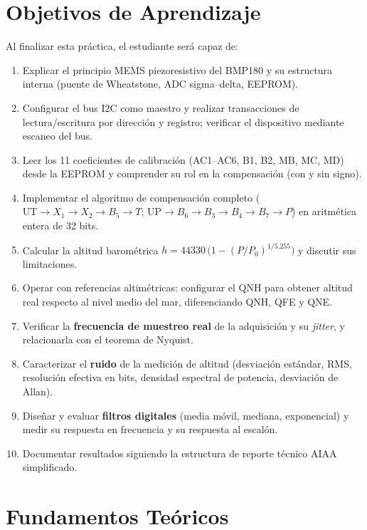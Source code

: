 \documentclass[11pt]{article}
\begin{document}
\section{Objetivos de Aprendizaje}

Al finalizar esta práctica, el estudiante será capaz de:
\begin{enumerate}
  \item Explicar el principio MEMS piezoresistivo del BMP180 y su estructura interna
        (puente de Wheatstone, ADC sigma--delta, EEPROM).
  \item Configurar el bus I2C como maestro y realizar transacciones de lectura/escritura
        por dirección y registro; verificar el dispositivo mediante escaneo del bus.
  \item Leer los 11 coeficientes de calibración (AC1--AC6, B1, B2, MB, MC, MD) desde la
        EEPROM y comprender su rol en la compensación (con y sin signo).
  \item Implementar el algoritmo de compensación completo
        ($\text{UT}\to X_1\to X_2\to B_5\to T$;
         $\text{UP}\to B_6\to B_3\to B_4\to B_7\to P$) en aritmética entera de 32 bits.
  \item Calcular la altitud barométrica
        $h = \num{44330}\,\bigl(1-(P/P_0)^{1/5.255}\bigr)$ y discutir sus limitaciones.
  \item Operar con referencias altimétricas: configurar el QNH para obtener altitud real
        respecto al nivel medio del mar, diferenciando QNH, QFE y QNE.
  \item Verificar la \textbf{frecuencia de muestreo real} de la adquisición y su
        \emph{jitter}, y relacionarla con el teorema de Nyquist.
  \item Caracterizar el \textbf{ruido} de la medición de altitud (desviación estándar,
        RMS, resolución efectiva en bits, densidad espectral de potencia, desviación de
        Allan).
  \item Diseñar y evaluar \textbf{filtros digitales} (media móvil, mediana, exponencial)
        y medir su respuesta en frecuencia y su respuesta al escalón.
  \item Documentar resultados siguiendo la estructura de reporte técnico AIAA
        simplificado.
\end{enumerate}

\section{Fundamentos Teóricos}
\end{document}
